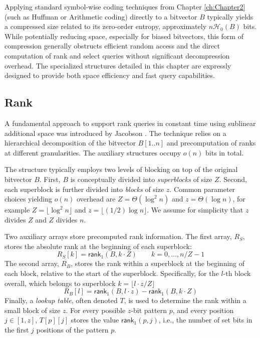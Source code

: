 \begin{remark}
    Applying standard symbol-wise coding techniques from Chapter \ref{ch:Chapter2} (such as Huffman or Arithmetic coding) directly to a bitvector $B$ typically yields a compressed size related to its zero-order entropy, approximately $n\mathcal{H}_0(B)$ bits. While potentially reducing space, especially for biased bitvectors, this form of compression generally obstructs efficient random access and the direct computation of \textsf{rank} and \textsf{select} queries without significant decompression overhead. The specialized structures detailed in this chapter are expressly designed to provide both space efficiency and fast query capabilities.
\end{remark}

\subsection{\textsf{Rank}} \label{subsec:rank}

A fundamental approach to support \textsf{rank} queries in constant time using sublinear additional space was introduced by Jacobson \cite{jacobson1988succinct}. The technique relies on a hierarchical decomposition of the bitvector $B[1..n]$ and precomputation of ranks at different granularities. The auxiliary structures occupy $o(n)$ bits in total.

The structure typically employs two levels of blocking on top of the original bitvector $B$. First, $B$ is conceptually divided into \emph{superblocks} of size $Z$. Second, each superblock is further divided into \emph{blocks} of size $z$. Common parameter choices yielding $o(n)$ overhead are $Z = \Theta(\log^2 n)$ and $z = \Theta(\log n)$, for example $Z = \lfloor \log^2 n \rfloor$ and $z = \lfloor (1/2) \log n \rfloor$. We assume for simplicity that $z$ divides $Z$ and $Z$ divides $n$.

Two auxiliary arrays store precomputed rank information. The first array, $R_S$, stores the absolute rank at the beginning of each superblock:
\begin{equation*}
    R_S[k] = \textsf{rank}_1(B, k \cdot Z) \qquad k = 0, \dots, n/Z - 1
\end{equation*}
The second array, $R_B$, stores the rank within a superblock at the beginning of each block, relative to the start of the superblock. Specifically, for the $l$-th block overall, which belongs to superblock $k = \lfloor l \cdot z / Z \rfloor$
\begin{equation*}
    R_B[l] = \textsf{rank}_1(B, l \cdot z) - \textsf{rank}_1(B, k \cdot Z)
\end{equation*}
Finally, a \emph{lookup table}, often denoted $T$, is used to determine the rank within a small block of size $z$. For every possible $z$-bit pattern $p$, and every position $j \in [1, z]$, $T[p][j]$ stores the value $\textsf{rank}_1(p, j)$, i.e., the number of set bits in the first $j$ positions of the pattern $p$.

